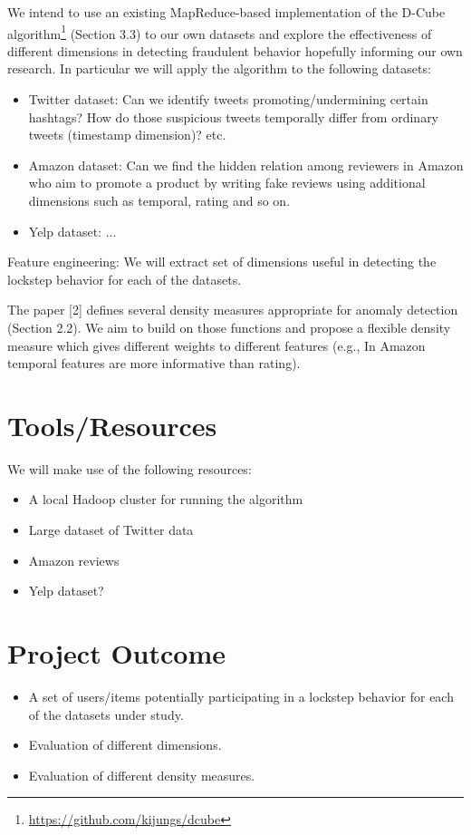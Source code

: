 \documentclass[12pt]{article}
\begin{document}
We intend to use an existing MapReduce-based implementation of the D-Cube algorithm\footnote{\href{https://github.com/kijungs/dcube}{https://github.com/kijungs/dcube}} (Section 3.3) to our own datasets and explore the effectiveness of different dimensions in detecting fraudulent behavior hopefully informing our own research. In particular we will apply the algorithm to the following datasets:
\begin{itemize}
\item Twitter dataset: Can we identify tweets promoting/undermining certain hashtags? How do those suspicious tweets temporally differ from ordinary tweets (timestamp dimension)? etc. 
\item Amazon dataset: Can we find the hidden relation among reviewers in Amazon who aim to promote a product by writing fake reviews using  additional dimensions such as temporal, rating and so on.  
\item Yelp dataset: ...
\end{itemize}

Feature engineering: We will extract set of dimensions useful in detecting the lockstep behavior for each of the datasets.	

The paper [2] defines several density measures appropriate for anomaly detection (Section 2.2). We aim to build on those functions and propose a flexible density measure which gives different weights to different features (e.g., In Amazon temporal features are more informative than rating).  
 
\section{Tools/Resources}
We will make use of the following resources:
\begin{itemize}
	\item A local Hadoop cluster for running the algorithm
	\item Large dataset of Twitter data
	\item Amazon reviews
	\item Yelp dataset?
\end{itemize}

\section{Project Outcome}

\begin{itemize}
	
	\item A set of users/items potentially participating in a lockstep behavior for each of the datasets under study.
	\item Evaluation of different dimensions. 
	\item Evaluation of different density measures.
\end{itemize}
\end{document}
